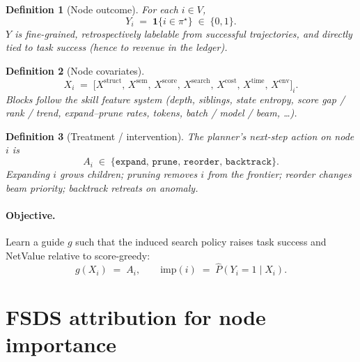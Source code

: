 \documentclass[11pt]{article}
\newtheorem{definition}{Definition}
\newcommand{\imp}{\mathrm{imp}}
\newcommand{\ind}{\mathbf{1}}
\begin{document}
\begin{definition}[Node outcome]
For each $i\in V$,
\begin{equation}
  Y_i \;=\; \ind\{ i \in \pi^\star \}\;\in\;\{0,1\}.
  \label{eq:Y}
\end{equation}
$Y$ is fine-grained, retrospectively labelable from successful trajectories,
and \emph{directly} tied to task success (hence to revenue in the ledger).
\end{definition}

\begin{definition}[Node covariates]
\begin{equation}
  X_i \;=\; \bigl[X^{\mathrm{struct}},\,
                 X^{\mathrm{sem}},\,
                 X^{\mathrm{score}},\,
                 X^{\mathrm{search}},\,
                 X^{\mathrm{cost}},\,
                 X^{\mathrm{time}},\,
                 X^{\mathrm{env}}\bigr]_i.
  \label{eq:X}
\end{equation}
Blocks follow the skill feature system (depth, siblings, state entropy,
score gap / rank / trend, expand--prune rates, tokens, batch / model /
beam, \ldots).
\end{definition}

\begin{definition}[Treatment / intervention]
The planner's next-step action on node $i$ is
\begin{equation}
  A_i \;\in\; \{\texttt{expand},\,\texttt{prune},\,\texttt{reorder},\,\texttt{backtrack}\}.
\end{equation}
Expanding $i$ grows children; pruning removes $i$ from the frontier;
reorder changes beam priority; backtrack retreats on anomaly.
\end{definition}

\paragraph{Objective.}
Learn a guide $g$ such that the induced search policy raises
task success and NetValue relative to score-greedy:
\begin{equation}
  g(X_i) \;=\; A_i,
  \qquad
  \imp(i) \;=\; \widehat{P}(Y_i{=}1\mid X_i).
\end{equation}

\section{FSDS attribution for node importance}
\label{sec:fsds}
\end{document}
